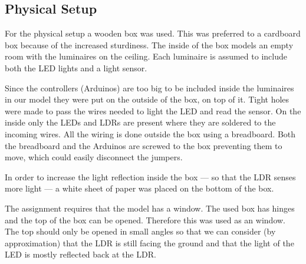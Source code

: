 \subsection{Physical Setup}
\label{sec:PhysicalSetup}

For the physical setup a wooden box was used. This was preferred to a cardboard box because of the increased sturdiness. The inside of the box models an empty room with the luminaires on the ceiling. Each luminaire is assumed to include both the LED lights and a light sensor.

Since the controllers (Arduinos) are too big to be included inside the luminaires in our model they were put on the outside of the box, on top of it. Tight holes were made to pass the wires needed to light the LED and read the sensor. On the inside only the LEDs and LDRs are present where they are soldered to the incoming wires. All the wiring is done outside the box using a breadboard. Both the breadboard and the Arduinos are screwed to the box preventing them to move, which could easily disconnect the jumpers.

In order to increase the light reflection inside the box --- so that the LDR senses more light --- a white sheet of paper was placed on the bottom of the box.

The assignment requires that the model has a window. The used box has hinges and the top of the box can be opened. Therefore this was used as an window. The top should only be opened in small angles so that we can consider (by approximation) that the LDR is still facing the ground and that the light of the LED is mostly reflected back at the LDR.
